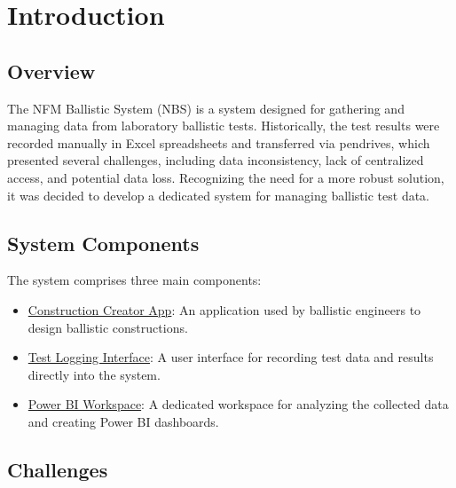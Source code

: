 \section{Introduction}

\subsection{Overview}

The NFM Ballistic System (NBS) is a system designed for gathering and managing data from laboratory ballistic tests. Historically, the test results were recorded manually in Excel spreadsheets and transferred via pendrives, which presented several challenges, including data inconsistency, lack of centralized access, and potential data loss. Recognizing the need for a more robust solution, it was decided to develop a dedicated system for managing ballistic test data.

\subsection{System Components}

The system comprises three main components:
\begin{itemize}
	\item \href{https://orga9b1f99a.crm4.dynamics.com/main.aspx?appid=05ee93e5-63be-e911-a95f-000d3ab5e874&pagetype=entitylist&etn=craab_nbsgrouporder&viewid=2e17b148-b9c6-4803-9c9e-780fa5c0f116&viewType=1039}{Construction Creator App}: An application used by ballistic engineers to design ballistic constructions.
	\item \href{https://apps.powerapps.com/play/e/default-6013a954-a3ca-49c2-b3e2-288264752369/a/e1db19c6-4475-4b66-be3b-fcec7d220129?tenantId=6013a954-a3ca-49c2-b3e2-288264752369}{Test Logging Interface}: A user interface for recording test data and results directly into the system.
	\item \href{https://app.powerbi.com/groups/acc871ab-9fcc-4ad0-ae62-d5a01f6be861/reports/107f9975-1c49-435a-96cd-3f074ccbc45f/ReportSection0d700cbb5dfcceb8b5e5?ctid=6013a954-a3ca-49c2-b3e2-288264752369&experience=power-bi}{Power BI Workspace}: A dedicated workspace for analyzing the collected data and creating Power BI dashboards.
\end{itemize}

\newpage

\subsection{Challenges}

